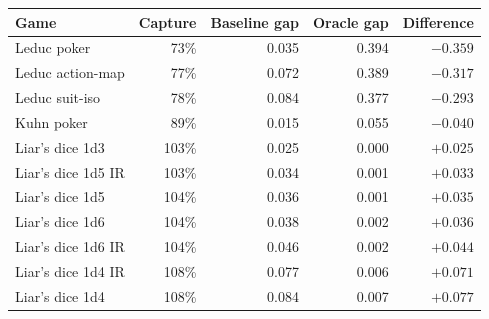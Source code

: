 \begin{tabular}{l r r r r}
\toprule
Game & Capture & Baseline gap & Oracle gap & Difference \\
\midrule
Leduc poker & 73\% & 0.035 & 0.394 & $-0.359$ \\
Leduc action-map & 77\% & 0.072 & 0.389 & $-0.317$ \\
Leduc suit-iso & 78\% & 0.084 & 0.377 & $-0.293$ \\
Kuhn poker & 89\% & 0.015 & 0.055 & $-0.040$ \\
Liar's dice 1d3 & 103\% & 0.025 & 0.000 & $+0.025$ \\
Liar's dice 1d5 IR & 103\% & 0.034 & 0.001 & $+0.033$ \\
Liar's dice 1d5 & 104\% & 0.036 & 0.001 & $+0.035$ \\
Liar's dice 1d6 & 104\% & 0.038 & 0.002 & $+0.036$ \\
Liar's dice 1d6 IR & 104\% & 0.046 & 0.002 & $+0.044$ \\
Liar's dice 1d4 IR & 108\% & 0.077 & 0.006 & $+0.071$ \\
Liar's dice 1d4 & 108\% & 0.084 & 0.007 & $+0.077$ \\
\bottomrule
\end{tabular}
